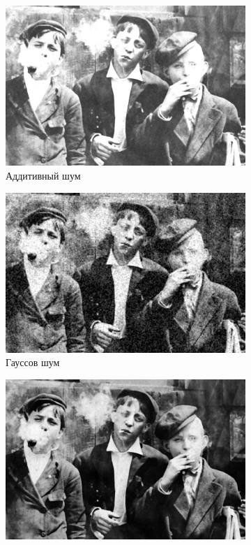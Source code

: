 \begin{figure}[ht]
\begin{subfigure}[b]{0.5\linewidth}
      \includegraphics[width=0.95\linewidth]{../Rang_Filter/Rang_Additive_noise_(k=5,r=14).jpg} 
      \caption{Аддитивный шум} 
      \label{rang_5_14:c} 
      \vspace{4ex}
    \end{subfigure}%
    \begin{subfigure}[b]{0.5\linewidth}
      \centering
      \includegraphics[width=0.95\linewidth]{../Rang_Filter/Rang_Gaussian_noise_(k=5,r=14).jpg} 
      \caption{Гауссов шум} 
      \label{rang_5_14:d} 
      \vspace{4ex}
    \end{subfigure}
    \begin{subfigure}[b]{0.5\linewidth}
      \centering
      \includegraphics[width=0.95\linewidth]{../Rang_Filter/Rang_Poisson_noise_(k=5,r=14).jpg} 

\end{subfigure}
\end{figure}
